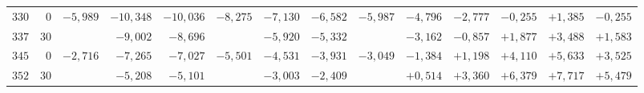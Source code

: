 \begin{landscape}
\begin{longtable}{@{}rr|r|r|r|r|r|r|r|r|r|r|r|r@{}}
\(330\) & \(0\) & \(-5{,}989\) & \(-10{,}348\) & \(-10{,}036\) & \(-8{,}275\) & \(-7{,}130\) & \(-6{,}582\) & \(-5{,}987\) & \(-4{,}796\) & \(-2{,}777\) & \(-0{,}255\) & \(+1{,}385\) & \(-0{,}255\)\\
\(337\) & \(30\) &  & \(-9{,}002\) & \(-8{,}696\) &  & \(-5{,}920\) & \(-5{,}332\) &  & \(-3{,}162\) & \(-0{,}857\) & \(+1{,}877\) & \(+3{,}488\) & \(+1{,}583\)\\
\(345\) & \(0\) & \(-2{,}716\) & \(-7{,}265\) & \(-7{,}027\) & \(-5{,}501\) & \(-4{,}531\) & \(-3{,}931\) & \(-3{,}049\) & \(-1{,}384\) & \(+1{,}198\) & \(+4{,}110\) & \(+5{,}633\) & \(+3{,}525\)\\
\(352\) & \(30\) &  & \(-5{,}208\) & \(-5{,}101\) &  & \(-3{,}003\) & \(-2{,}409\) &  & \(+0{,}514\) & \(+3{,}360\) & \(+6{,}379\) & \(+7{,}717\) & \(+5{,}479\)\\
\end{longtable}
\clearpage
\endgroup
\end{landscape}
\clearpage
